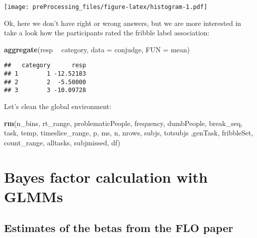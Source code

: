 \documentclass[
]{article}
\newenvironment{Shaded}{\begin{snugshade}}{\end{snugshade}}
\newcommand{\DataTypeTok}[1]{\textcolor[rgb]{0.13,0.29,0.53}{#1}}
\newcommand{\KeywordTok}[1]{\textcolor[rgb]{0.13,0.29,0.53}{\textbf{#1}}}
\newcommand{\NormalTok}[1]{#1}
\newcommand{\OperatorTok}[1]{\textcolor[rgb]{0.81,0.36,0.00}{\textbf{#1}}}
\newcommand{\StringTok}[1]{\textcolor[rgb]{0.31,0.60,0.02}{#1}}
\begin{document}
\texttt{[image: preProcessing\_files/figure-latex/histogram-1.pdf]}

Ok, here we don't have right or wrong answers, but we are more
interested in take a look how the participants rated the fribble label
association:

\begin{Shaded}
\begin{Highlighting}[]
\KeywordTok{aggregate}\NormalTok{(resp }\OperatorTok{~}\StringTok{ }\NormalTok{category, }\DataTypeTok{data =}\NormalTok{ conjudge, }\DataTypeTok{FUN =}\NormalTok{ mean)}
\end{Highlighting}
\end{Shaded}

\begin{verbatim}
##   category      resp
## 1        1 -12.52183
## 2        2  -5.50000
## 3        3 -10.09728
\end{verbatim}

Let's clean the global environment:

\begin{Shaded}
\begin{Highlighting}[]
\KeywordTok{rm}\NormalTok{(n_bins, rt_range, problematicPeople, frequency, dumbPeople, break_seq, task, temp, timeslice_range, p, ms, n, nrows, subjs, totsubjs ,genTask, fribbleSet, count_range, alltasks, subjmissed, df)}
\end{Highlighting}
\end{Shaded}

\hypertarget{bayes-factor-calculation-with-glmms}{%
\section{Bayes factor calculation with
GLMMs}\label{bayes-factor-calculation-with-glmms}}

\hypertarget{estimates-of-the-betas-from-the-flo-paper}{%
\subsection{Estimates of the betas from the FLO
paper}\label{estimates-of-the-betas-from-the-flo-paper}}
\end{document}
